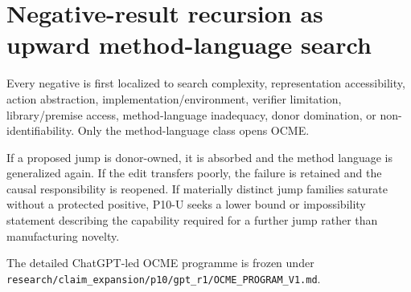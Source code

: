 \section{Negative-result recursion as upward method-language search}
Every negative is first localized to search complexity, representation accessibility, action abstraction, implementation/environment, verifier limitation, library/premise access, method-language inadequacy, donor domination, or non-identifiability. Only the method-language class opens OCME.

If a proposed jump is donor-owned, it is absorbed and the method language is generalized again. If the edit transfers poorly, the failure is retained and the causal responsibility is reopened. If materially distinct jump families saturate without a protected positive, P10-U seeks a lower bound or impossibility statement describing the capability required for a further jump rather than manufacturing novelty.

The detailed ChatGPT-led OCME programme is frozen under \texttt{research/claim\_expansion/p10/gpt\_r1/OCME\_PROGRAM\_V1.md}.

